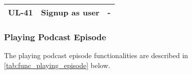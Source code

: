 \documentclass[../report.tex]{subfiles}
\begin{document}
\begin{longtable}[c]{|l|l|l|}
  \rowcolor[HTML]{FAFAFA} 
  UL-41                                                        & Signup as user                                                                                                                                      & -                                                                                                                                                                                                                                                                                                                                                                          \\ \hline
\end{longtable}

\subsubsection{Playing Podcast Episode}

The playing podcast episode functionalities are described in \cref{tab:func_playing_episode} below.
\end{document}
